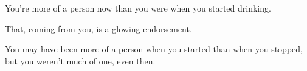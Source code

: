 \begin{paracol}{2}
\begin{leftcolumn}
\begin{ally}
You're more of a person now than you were when you started drinking.
\end{ally}
That, coming from you, is a glowing endorsement.

\begin{ally}
You may have been more of a person when you started than when you stopped, but you weren't much of one, even then.
\end{ally}
\newpage
\end{leftcolumn}
\end{paracol}
